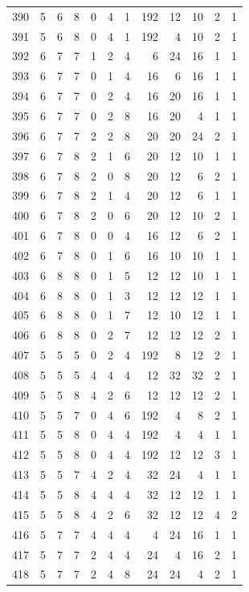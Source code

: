 \documentclass[11pt,a4paper]{article}
\begin{document}
\begin{longtable}{r|rrr|rrr|rrr|rr}
390 & 5 & 6 & 8 & 0 & 4 & 1 & 192 & 12 & 10 & 2 & 1\\
391 & 5 & 6 & 8 & 0 & 4 & 1 & 192 & 4 & 10 & 2 & 1\\
392 & 6 & 7 & 7 & 1 & 2 & 4 & 6 & 24 & 16 & 1 & 1\\
393 & 6 & 7 & 7 & 0 & 1 & 4 & 16 & 6 & 16 & 1 & 1\\
394 & 6 & 7 & 7 & 0 & 2 & 4 & 16 & 20 & 16 & 1 & 1\\
395 & 6 & 7 & 7 & 0 & 2 & 8 & 16 & 20 & 4 & 1 & 1\\
396 & 6 & 7 & 7 & 2 & 2 & 8 & 20 & 20 & 24 & 2 & 1\\
397 & 6 & 7 & 8 & 2 & 1 & 6 & 20 & 12 & 10 & 1 & 1\\
398 & 6 & 7 & 8 & 2 & 0 & 8 & 20 & 12 & 6 & 2 & 1\\
399 & 6 & 7 & 8 & 2 & 1 & 4 & 20 & 12 & 6 & 1 & 1\\
400 & 6 & 7 & 8 & 2 & 0 & 6 & 20 & 12 & 10 & 2 & 1\\
401 & 6 & 7 & 8 & 0 & 0 & 4 & 16 & 12 & 6 & 2 & 1\\
402 & 6 & 7 & 8 & 0 & 1 & 6 & 16 & 10 & 10 & 1 & 1\\
403 & 6 & 8 & 8 & 0 & 1 & 5 & 12 & 12 & 10 & 1 & 1\\
404 & 6 & 8 & 8 & 0 & 1 & 3 & 12 & 12 & 12 & 1 & 1\\
405 & 6 & 8 & 8 & 0 & 1 & 7 & 12 & 10 & 12 & 1 & 1\\
406 & 6 & 8 & 8 & 0 & 2 & 7 & 12 & 12 & 12 & 2 & 1\\
407 & 5 & 5 & 5 & 0 & 2 & 4 & 192 & 8 & 12 & 2 & 1\\
408 & 5 & 5 & 5 & 4 & 4 & 4 & 12 & 32 & 32 & 2 & 1\\
409 & 5 & 5 & 8 & 4 & 2 & 6 & 12 & 12 & 12 & 2 & 1\\
410 & 5 & 5 & 7 & 0 & 4 & 6 & 192 & 4 & 8 & 2 & 1\\
411 & 5 & 5 & 8 & 0 & 4 & 4 & 192 & 4 & 4 & 1 & 1\\
412 & 5 & 5 & 8 & 0 & 4 & 4 & 192 & 12 & 12 & 3 & 1\\
413 & 5 & 5 & 7 & 4 & 2 & 4 & 32 & 24 & 4 & 1 & 1\\
414 & 5 & 5 & 8 & 4 & 4 & 4 & 32 & 12 & 12 & 1 & 1\\
415 & 5 & 5 & 8 & 4 & 2 & 6 & 32 & 12 & 12 & 4 & 2\\
416 & 5 & 7 & 7 & 4 & 4 & 4 & 4 & 24 & 16 & 1 & 1\\
417 & 5 & 7 & 7 & 2 & 4 & 4 & 24 & 4 & 16 & 2 & 1\\
418 & 5 & 7 & 7 & 2 & 4 & 8 & 24 & 24 & 4 & 2 & 1\\

\end{longtable}
\end{document}
